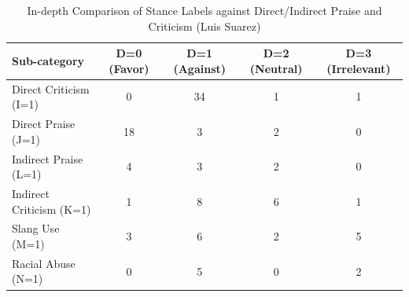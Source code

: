 \documentclass{article}
\begin{document}
\begin{table}[htbp] %
    \centering %
    \caption{In-depth Comparison of Stance Labels against Direct/Indirect Praise and Criticism (Luis Suarez) } %
    \label{tab:statistical_summary_d} %
    \renewcommand{\arraystretch}{1.2} %
    \begin{adjustbox}{max width=\linewidth} %
        \begin{tabular}{l c c c c} %
            \toprule %
            \textbf{Sub-category} & \textbf{D=0 (Favor)} & \textbf{D=1 (Against)} & \textbf{D=2 (Neutral)} & \textbf{D=3 (Irrelevant)} \\ %
            \midrule %
            Direct Criticism (I=1)  & 0  & 34 & 1  & 1 \\
            Direct Praise (J=1)     & 18 & 3  & 2  & 0 \\
            Indirect Praise (L=1)   & 4  & 3  & 2  & 0 \\
            Indirect Criticism (K=1) & 1  & 8  & 6  & 1 \\
            Slang Use (M=1)         & 3  & 6  & 2  & 5 \\
            Racial Abuse (N=1)      & 0  & 5  & 0  & 2 \\
            \bottomrule %
        \end{tabular}
    \end{adjustbox}
\end{table}

\FloatBarrier %
\end{document}
